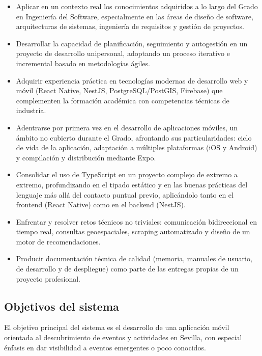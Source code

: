 \begin{itemize}
    \item Aplicar en un contexto real los conocimientos adquiridos a lo largo del Grado en Ingeniería del Software, especialmente en las áreas de diseño de software, arquitecturas de sistemas, ingeniería de requisitos y gestión de proyectos.

    \item Desarrollar la capacidad de planificación, seguimiento y autogestión en un proyecto de desarrollo unipersonal, adoptando un proceso iterativo e incremental basado en metodologías ágiles.

    \item Adquirir experiencia práctica en tecnologías modernas de desarrollo web y móvil (React Native, NestJS, PostgreSQL/PostGIS, Firebase) que complementen la formación académica con competencias técnicas de industria.

    \item Adentrarse por primera vez en el desarrollo de aplicaciones móviles, un ámbito no cubierto durante el Grado, afrontando sus particularidades: ciclo de vida de la aplicación, adaptación a múltiples plataformas (iOS y Android) y compilación y distribución mediante Expo.

    \item Consolidar el uso de TypeScript en un proyecto complejo de extremo a extremo, profundizando en el tipado estático y en las buenas prácticas del lenguaje más allá del contacto puntual previo, aplicándolo tanto en el frontend (React Native) como en el backend (NestJS).

    \item Enfrentar y resolver retos técnicos no triviales: comunicación bidireccional en tiempo real, consultas geoespaciales, scraping automatizado y diseño de un motor de recomendaciones.

    \item Producir documentación técnica de calidad (memoria, manuales de usuario, de desarrollo y de despliegue) como parte de las entregas propias de un proyecto profesional.
\end{itemize}

\subsection{Objetivos del sistema}

El objetivo principal del sistema es el desarrollo de una aplicación móvil orientada al descubrimiento de eventos y actividades en Sevilla, con especial énfasis en dar visibilidad a eventos emergentes o poco conocidos.


